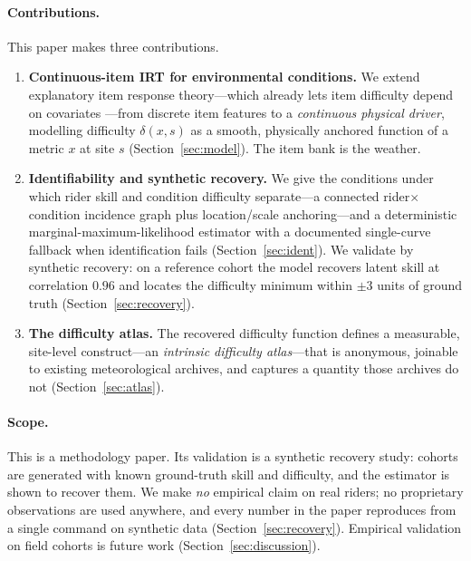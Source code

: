 \paragraph{Contributions.} This paper makes three contributions.
\begin{enumerate}
  \item \textbf{Continuous-item IRT for environmental conditions.} We extend
    explanatory item response theory---which already lets item difficulty depend
    on covariates \citep{fischer1973,deboeck2004}---from discrete item features to
    a \emph{continuous physical driver}, modelling difficulty $\delta(x,s)$ as a
    smooth, physically anchored function of a metric $x$ at site $s$
    (Section~\ref{sec:model}). The item bank is the weather.
  \item \textbf{Identifiability and synthetic recovery.} We give the conditions
    under which rider skill and condition difficulty separate---a connected
    rider${\times}$condition incidence graph plus location/scale anchoring---and a
    deterministic marginal-maximum-likelihood estimator with a documented
    single-curve fallback when identification fails (Section~\ref{sec:ident}). We
    validate by synthetic recovery: on a reference cohort the model recovers
    latent skill at correlation $0.96$ and locates the difficulty minimum within
    $\pm 3$ units of ground truth (Section~\ref{sec:recovery}).
  \item \textbf{The difficulty atlas.} The recovered difficulty function defines a
    measurable, site-level construct---an \emph{intrinsic difficulty atlas}---that
    is anonymous, joinable to existing meteorological archives, and captures a
    quantity those archives do not (Section~\ref{sec:atlas}).
\end{enumerate}

\paragraph{Scope.} This is a methodology paper. Its validation is a synthetic
recovery study: cohorts are generated with known ground-truth skill and
difficulty, and the estimator is shown to recover them. We make \emph{no}
empirical claim on real riders; no proprietary observations are used anywhere,
and every number in the paper reproduces from a single command on synthetic data
(Section~\ref{sec:recovery}). Empirical validation on field cohorts is future
work (Section~\ref{sec:discussion}).
